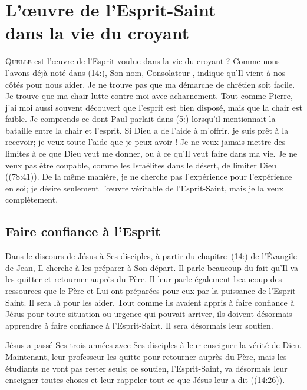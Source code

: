 \chapter[L'\oe{}uvre de l'Esprit-Saint dans la vie du croyant]{L'\oe{}uvre de l'Esprit-Saint\\ dans la vie du croyant}
\renewcommand{\chaphead}{\textls[0]{L'\oe{}uvre de l'Esprit-Saint dans la vie du croyant}}

\lettrine{Q}{uelle} est l'œuvre de l'Esprit
 voulue dans la vie du croyant ?
 Comme nous l'avons déjà noté dans (14:), Son nom,
 \Og Con\-so\-la\-teur \Fg{}, indique qu'Il vient à nos côtés pour nous aider.
 Je ne trouve pas que ma démarche de chrétien soit facile.
 Je trouve que ma chair lutte contre moi avec acharnement.
 Tout comme Pierre, j'ai moi aussi souvent découvert que l'esprit
 est bien disposé, mais que la chair est faible.
 Je comprends ce dont Paul parlait dans (5:) lorsqu'il
 mentionnait la bataille entre la chair et l'esprit.
 Si Dieu a de l'aide à m'offrir, je suis prêt à la recevoir;
 je veux toute l'aide que je peux avoir !
 Je ne veux jamais mettre des limites à ce que Dieu veut me donner,
 ou à ce qu'Il veut faire dans ma vie. Je ne veux pas être coupable,
 comme les Israélites dans le désert,
 de limiter Dieu ((78:41)).
 De la même manière, je ne cherche pas l'expérience 
 pour l'expérience en soi; je désire seulement l'œuvre véritable
 de l'Esprit-Saint, mais je la veux complètement.

\section{Faire confiance \`a l'Esprit}

Dans le discours de Jésus à Ses disciples, à partir du chapitre~(14:)
 de l'Évangile de Jean, Il cherche à les préparer à Son départ.
 Il parle beaucoup du fait qu'Il va les quitter et retourner auprès du Père.
 Il leur parle également beaucoup des ressources que le Père et Lui
 ont préparées pour eux par la puissance de l'Esprit-Saint.
 Il sera là pour les aider. Tout comme ils avaient appris à faire confiance
 à Jésus pour toute situation ou urgence qui pouvait arriver,
 ils doivent désormais apprendre à faire confiance à l'Esprit-Saint.
 Il sera désormais leur soutien.

Jésus a passé Ses trois années avec Ses disciples à leur enseigner
 la vérité de Dieu. Maintenant, leur professeur les quitte pour retourner
 auprès du Père, mais les étudiants ne vont pas rester seuls;
 ce soutien, l'Esprit-Saint, va désormais leur enseigner toutes choses
 et leur rappeler tout ce que Jésus leur a dit
 ((14:26)).

